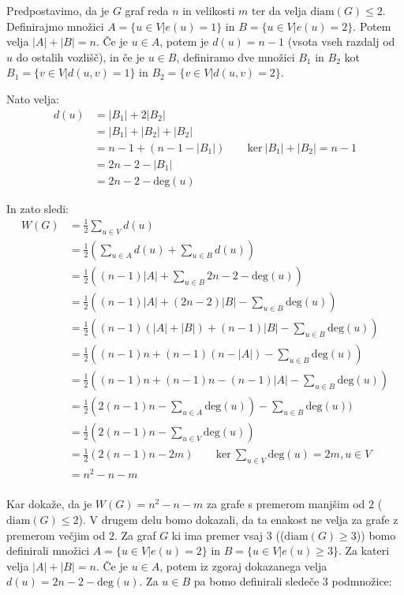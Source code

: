 \documentclass[fin1, tisk]{fmfdelo}
\begin{document}
\begin{dokaz}
Predpostavimo, da je $G$ graf reda $n$ in velikosti $m$ ter da velja $\text{diam}(G) \leq 2$.
Definirajmo množici $A = \{u \in V | e(u) = 1\}$ in $B = \{u \in V | e(u) = 2\}$. Potem velja $|A| + |B| = n$.
Če je $u \in A$, potem je $d(u) = n - 1$ (vsota vseh razdalj od $u$ do ostalih vozlišč), in če je $u \in B$,
definiramo dve množici $B_1$ in $B_2$ kot $B_1 = \{v \in V | d(u, v) = 1\}$ in $B_2 = \{v \in V | d(u, v) = 2\}$.

Nato velja:
\begin{align*}
d(u) &= |B_1| + 2|B_2| \\
&= |B_1| + |B_2| + |B_2| \\
&= n - 1 + (n - 1 - |B_1|) \qquad \text{ker} \ |B_1| + |B_2| = n - 1 \\
&= 2n - 2 - |B_1| \\
&= 2n - 2 - \text{deg}(u)
\end{align*}

In zato sledi:
\begin{align*}
W(G) &= \frac{1}{2} \sum_{u \in V} d(u) \\
&= \frac{1}{2}( \sum_{u \in A} d(u) + \sum_{u \in B} d(u)) \\
&= \frac{1}{2}( (n - 1)|A| + \sum_{u \in B} 2n - 2 - \text{deg}(u)) \\
&= \frac{1}{2}( (n - 1)|A| + (2n - 2)|B| - \sum_{u \in B} \text{deg}(u)) \\
&= \frac{1}{2}( (n - 1)(|A| + |B|) + (n - 1)|B| - \sum_{u \in B} \text{deg}(u)) \\
&= \frac{1}{2}( (n - 1)n + (n - 1)(n - |A|) - \sum_{u \in B} \text{deg}(u)) \\
&= \frac{1}{2}( (n - 1)n + (n - 1)n - (n - 1)|A| - \sum_{u \in B} \text{deg}(u)) \\
&= \frac{1}{2}( 2(n - 1)n  - \sum_{u \in A} \text{deg}(u)) - \sum_{u \in B} \text{deg}(u)) \\
&= \frac{1}{2}( 2(n - 1)n  - \sum_{u \in V} \text{deg}(u)) \\
&= \frac{1}{2}( 2(n - 1)n  - 2m) \qquad \text{ker} \ \sum_{u \in V} \text{deg}(u) = 2m, u \in V \\
&= n^2 - n - m \\
\end{align*}

Kar dokaže, da je $W(G) = n^2 - n - m$ za grafe s premerom manjšim od $2$ ($\text{diam}(G) \leq 2$). V drugem delu
bomo dokazali, da ta enakost ne velja za grafe z premerom večjim od $2$. Za graf $G$ ki ima premer vsaj $3$ (($\text{diam}(G) \geq 3$))
bomo definirali množici $A = \{u \in V | e(u) = 2\}$ in $B = \{u \in V | e(u) \geq 3\}$. Za kateri velja $|A| + |B| = n$.
Če je $u \in A$, potem iz zgoraj dokazanega velja $d(u) = 2n - 2 - \text{deg}(u)$.
Za $u \in B$ pa bomo definirali sledeče 3 podmnožice:



\end{dokaz}
\end{document}
